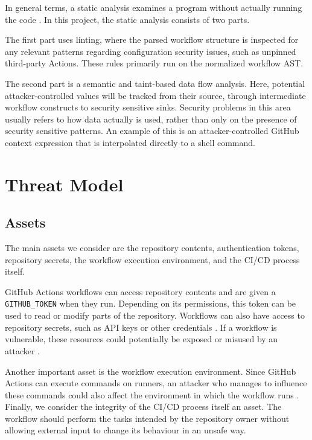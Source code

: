 \documentclass{article}
\begin{document}
In general terms, a static analysis examines a program without actually running the code \cite{ibmstatic}. In this project, the static analysis consists of two parts. 

The first part uses linting, where the parsed workflow structure is inspected for any relevant patterns regarding configuration security issues, such as unpinned third-party Actions. These rules primarily run on the normalized workflow AST. 

The second part is a semantic and taint-based data flow analysis. Here, potential attacker-controlled values will be tracked from their source, through intermediate workflow constructs to security sensitive sinks. Security problems in this area usually refers to how data actually is used, rather than only on the presence of security sensitive patterns. An example of this is an attacker-controlled GitHub context expression that is interpolated directly to a shell command. 

\section{Threat Model}

\subsection{Assets}

The main assets we consider are the repository contents, authentication tokens, repository secrets, the workflow execution environment, and the CI/CD process itself.

GitHub Actions workflows can access repository contents and are given a
\texttt{GITHUB\_TOKEN} when they run. Depending on its permissions, this token can be used to read or modify parts of the repository. Workflows can also have access to repository secrets, such as API keys or other credentials \cite{githubtoken,githubsecurity}. If a workflow is vulnerable, these resources could potentially be exposed or misused by an attacker \cite{githubrunners}.

Another important asset is the workflow execution environment. Since GitHub Actions can execute commands on runners, an attacker who manages to influence these commands could also affect the environment in which the workflow runs \cite{githubrunners}. Finally, we consider the integrity of the CI/CD process itself an asset. The workflow should perform the tasks intended by the repository owner without allowing external input to change its behaviour in an unsafe way.
\end{document}
